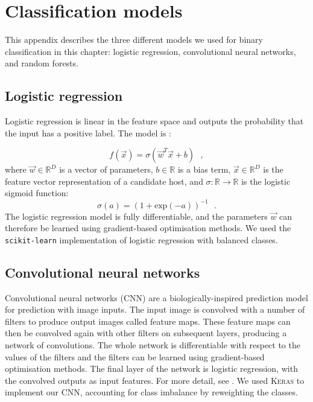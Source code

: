 
\appendix


\section{Classification models}\label{sec:atlas-xid-models}

  This appendix describes the three different models we used for binary classification in this chapter: logistic
  regression, convolutional neural networks, and random forests.

  \subsection{Logistic regression}
  \label{sec:atlas-logistic-regression}
    Logistic regression is linear in the feature space and outputs the
    probability that the input has a positive label. The model is
    \citep{bishop06ml}:

    \begin{equation}
        f(\vec x) = \sigma(\vec w^T \vec x + b) \,\,\,\,,
    \end{equation}
    where $\vec w \in \mathbb{R}^D$ is a vector of parameters, $b \in \mathbb{R}$ is a bias term, $\vec x \in \mathbb{R}^D$ is the feature vector representation of a candidate host, and $\sigma : \mathbb{R} \to \mathbb{R}$ is the logistic sigmoid function: \begin{equation}
        \sigma(a) = (1 + \mathrm{exp}(-a))^{-1}\,\,\,\,.
    \end{equation}%
    The logistic regression model is fully differentiable, and the parameters
    $\vec w$ can therefore be learned using gradient-based optimisation
    methods. {We used the \texttt{scikit-learn} \citep{pedregosa11sklearn}
    implementation of logistic regression with balanced classes}.

  \subsection{Convolutional neural networks}
  \label{sec:atlas-convolutional-neural-networks}

    Convolutional neural networks (CNN) are a biologically-inspired prediction
    model for prediction with image inputs. The input image is convolved with
    a number of filters to produce output images called feature maps. These
    feature maps can then be convolved again with other filters on subsequent
    layers, producing a network of convolutions. The whole network is
    differentiable with respect to the values of the filters and the filters
    can be learned using gradient-based optimisation methods. The final layer
    of the network is logistic regression, with the convolved outputs as input
    features. For more detail, see \citet[subsection II.A][]{lecun98}. We used
    \textsc{Keras} \citep{chollet15keras} to implement our CNN, accounting for
    class imbalance by reweighting the classes.

